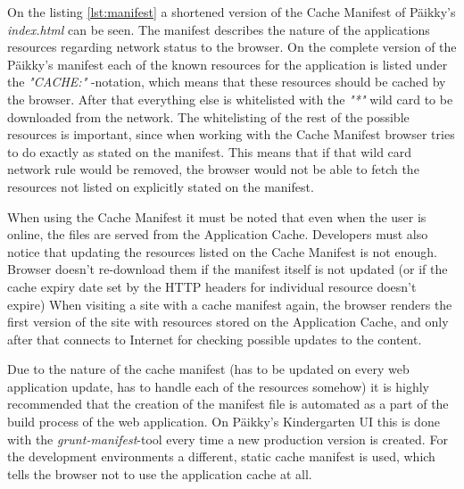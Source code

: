 On the listing \ref{lst:manifest} a shortened version of the Cache Manifest of Päikky's \textit{index.html} can be seen. The manifest describes the nature of the applications resources regarding network status to the browser. On the complete version of the Päikky's manifest each of the known resources for the application is listed under the \textit{"CACHE:"} -notation, which means that these resources should be cached by the browser. After that everything else is whitelisted with the \textit{"*"} wild card to be downloaded from the network. The whitelisting of the rest of the possible resources is important, since when working with the Cache Manifest browser tries to do exactly as stated on the manifest. This means that if that wild card network rule would be removed, the browser would not be able to fetch the resources not listed on explicitly stated on the manifest. \cite[Page 212]{lawson_introducing_2011}%


When using the Cache Manifest it must be noted that even when the user is online, the files are served from the Application Cache. Developers must also notice that updating the resources listed on the Cache Manifest is not enough. Browser doesn't re-download them if the manifest itself is not updated (or if the cache expiry date set by the HTTP headers for individual resource doesn't expire) When visiting a site with a cache manifest again, the browser renders the first version of the site with resources stored on the Application Cache, and only after that connects to Internet for checking possible updates to the content. \cite{archibald_application_2012}

Due to the nature of the cache manifest (has to be updated on every web application update, has to handle each of the resources somehow) it is highly recommended that the creation of the manifest file is automated as a part of the build process of the web application. On Päikky's Kindergarten UI this is done with the \textit{grunt-manifest}-tool every time a new production version is created. For the development environments a different, static cache manifest is used, which tells the browser not to use the application cache at all.

